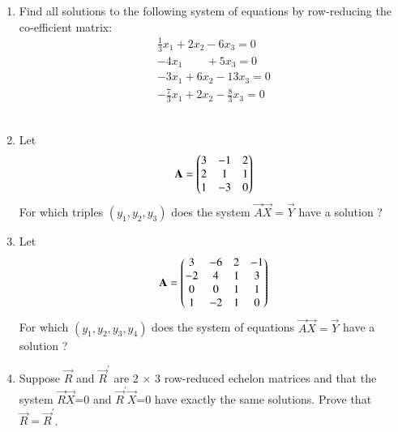 \renewcommand{\theequation}{\theenumi}
\renewcommand{\thefigure}{\theenumi}
\begin{enumerate}[label=\thesubsection.\arabic*.,ref=\thesubsection.\theenumi]
%
\item Find all solutions to the following system of equations by row-reducing the co-efficient matrix:
\begin{align}
\frac{1}{3}x_1 +2x_2 - 6x_3 =0\\
-4x_1\quad \quad+ 5x_3=0\\
-3x_1+6x_2-13x_3=0\\
-\frac{7}{3}x_1 +2x_2 - \frac{8}{3}x_3 =0
\end{align}
\\
\solution

%
\item Let
\begin{align}
    \mathbf{A}=\begin{pmatrix}3 & -1 & 2\\2 & 1 & 1\\1 & -3 & 0\end{pmatrix} 
\end{align}
For which triples $(y_1,y_2,y_3)$ does the system $\vec{A}\vec{X}=\vec{Y}$ have a solution ? 
%
%
\\
\solution

\item Let
\begin{align}
    \mathbf{A}=\begin{pmatrix}3 & -6 & 2 & -1\\-2 & 4 & 1 & 3\\0 & 0 & 1& 1\\1 & -2 & 1 & 0\end{pmatrix} 
\end{align}
For which $(y_1,y_2,y_3,y_4)$ does the system of equations $\vec{A}\vec{X}=\vec{Y}$ have a solution ? 
%
\solution

%
%
\item Suppose $\vec{R}$ and $\vec{R}^{'}$ are 2 $\times$ 3 row-reduced echelon matrices and that the system $\vec{R}$$\vec{X}$=0 and $\vec{R}^{'}\vec{X}$=0 have exactly the same solutions. Prove 
that $\vec{R}=\vec{R}^{'}$.

\solution

\end{enumerate}


